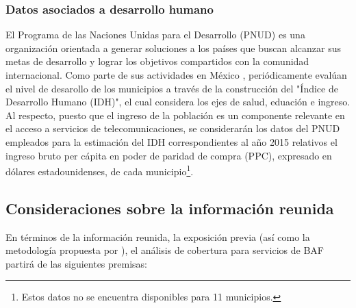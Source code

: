 \documentclass[9pt,twocolumn,twoside]{ilcss}
\begin{document}
 
\subsubsection{Datos asociados a desarrollo humano}

El Programa de las Naciones Unidas para el Desarrollo (PNUD) es una organización orientada a generar soluciones a los países que buscan alcanzar sus metas de desarrollo y lograr los objetivos compartidos con la comunidad internacional. Como parte de sus actividades en México \cite{ONU2015}, periódicamente evalúan el nivel de desarollo de los municipios a través de la construcción del "Índice de Desarrollo Humano (IDH)", el cual considera los ejes de salud, eduación e ingreso. Al respecto, puesto que el ingreso de la población es un componente relevante en el acceso a servicios de telecomunicaciones, se considerarán los datos del PNUD empleados para la estimación del IDH correspondientes al año 2015 relativos el ingreso bruto per cápita en poder de paridad de compra (PPC), expresado en dólares estadounidenses, de cada municipio\footnote{Estos datos no se encuentra disponibles para 11 municipios. 
}.

\subsection{Consideraciones sobre la información reunida}

En términos de la información reunida, la exposición previa (así como la metodología propuesta por \cite{IFTcobertura2018}), el análisis de cobertura para servicios de BAF partirá de las siguientes premisas:
\end{document}
